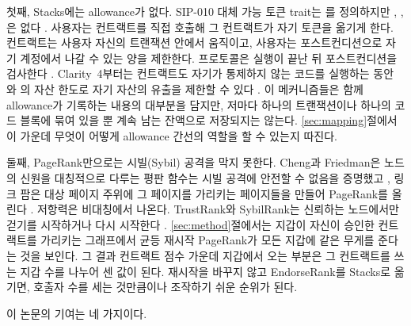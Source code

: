 첫째, Stacks에는 allowance가 없다. SIP-010 대체 가능 토큰 trait는 를 정의하지만 , , 은 없다 \cite{sip010}. 사용자는 컨트랙트를 직접 호출해 그 컨트랙트가 자기 토큰을 옮기게 한다. 컨트랙트는 사용자 자신의 트랜잭션 안에서 움직이고, 사용자는 포스트컨디션으로 자기 계정에서 나갈 수 있는 양을 제한한다. 프로토콜은 실행이 끝난 뒤 포스트컨디션을 검사한다 \cite{sip005}. Clarity~4부터는 컨트랙트도 자기가 통제하지 않는 코드를 실행하는 동안 와 의 자산 한도로 자기 자산의 유출을 제한할 수 있다 \cite{sip033}. 이 메커니즘들은 함께 allowance가 기록하는 내용의 대부분을 담지만, 저마다 하나의 트랜잭션이나 하나의 코드 블록에 묶여 있을 뿐 계속 남는 잔액으로 저장되지는 않는다. \ref{sec:mapping}절에서 이 가운데 무엇이 어떻게 allowance 간선의 역할을 할 수 있는지 따진다.

둘째, PageRank만으로는 시빌(Sybil) 공격을 막지 못한다. Cheng과 Friedman은 노드의 신원을 대칭적으로 다루는 평판 함수는 시빌 공격에 안전할 수 없음을 증명했고 \cite{cheng2005sybilproof}, 링크 팜은 대상 페이지 주위에 그 페이지를 가리키는 페이지들을 만들어 PageRank를 올린다 \cite{gyongyi2005alliances}. 저항력은 비대칭에서 나온다. TrustRank와 SybilRank는 신뢰하는 노드에서만 걷기를 시작하거나 다시 시작한다 \cite{gyongyi2004trustrank,cao2012sybilrank}. \ref{sec:method}절에서는 지갑이 자신이 승인한 컨트랙트를 가리키는 그래프에서 균등 재시작 PageRank가 모든 지갑에 같은 무게를 준다는 것을 보인다. 그 결과 컨트랙트 점수 가운데 지갑에서 오는 부분은 그 컨트랙트를 쓰는 지갑 수를 나누어 센 값이 된다. 재시작을 바꾸지 않고 EndorseRank를 Stacks로 옮기면, 호출자 수를 세는 것만큼이나 조작하기 쉬운 순위가 된다.

이 논문의 기여는 네 가지이다.

